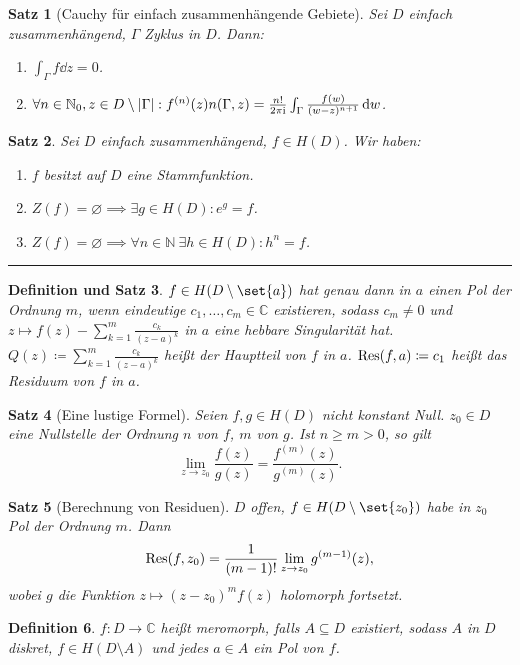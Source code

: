 \documentclass[a4paper]{article}
\newcounter{Sec}
\theoremstyle{marginbreak}
\newtheorem{definition}{Definition}[Sec]
\newtheorem{satz}[definition]{Satz}
\newtheorem{defsatz}[definition]{Definition und Satz}
\newcommand{\sep}{%
	\rule{\textwidth}{0.3pt}%
	\stepcounter{Sec}%
	}
\newcommand{\C}{\mathbb{C}}
\renewcommand{\i}{\mathrm{i}}
\begin{document}
	\begin{satz}[Cauchy für einfach zusammenhängende Gebiete]
		Sei $D$ einfach zusammenhängend, $\Gamma$ Zyklus in $D$. Dann:
		\begin{enumerate}[label=(\alph*)]
			\item $\int_\Gamma f\dd{z}=0$.
			\item $\forall n\in\mathbb{N}_0, z\in D\setminus\abs{\Gamma}:f^{(n)}(z)n(\Gamma, z)=\frac{n!}{2\pi\i}\int_\Gamma\frac{f(w)}{(w-z)^{n+1}}\dd{w}$.
		\end{enumerate}
	\end{satz}
	\begin{satz}
		Sei $D$ einfach zusammenhängend, $f\in H(D)$. Wir haben:
		\begin{enumerate}[label=(\alph*)]
			\item $f$ besitzt auf $D$ eine Stammfunktion.
			\item $Z(f)=\varnothing\implies\exists g\in H(D): e^g=f$.
			\item $Z(f)=\varnothing\implies\forall n\in\mathbb{N}~\exists h\in H(D): h^n=f$.
		\end{enumerate}
	\end{satz}
	\sep
	\begin{defsatz}
		$f\in H(D\setminus\set{a})$ hat genau dann in $a$ einen Pol der Ordnung $m$, wenn eindeutige $c_1,\ldots,c_m\in\C$
		existieren, sodass $c_m\neq 0$ und $z\mapsto f(z)-\sum_{k=1}^m\frac{c_k}{(z-a)^k}$ in $a$ eine hebbare Singularität hat.
		$Q(z)\coloneqq\sum_{k=1}^m\frac{c_k}{(z-a)^k}$ heißt der Hauptteil von $f$ in $a$. $\Res(f, a)\coloneqq c_1$ heißt das
		Residuum von $f$ in $a$.
	\end{defsatz}
	\begin{satz}[Eine lustige Formel]
		Seien $f, g\in H(D)$ nicht konstant Null. $z_0\in D$ eine Nullstelle der Ordnung
		$n$ von $f$, $m$ von $g$. Ist $n\geq m>0$, so gilt
		\[
			\lim_{z\to z_0}\frac{f(z)}{g(z)}=\frac{f^{(m)}(z)}{g^{(m)}(z)}.
		\]
	\end{satz}
	\begin{satz}[Berechnung von Residuen]
		$D$ offen, $f\in H(D\setminus\set{z_0})$ habe in $z_0$ Pol der Ordnung $m$. Dann
		\[
			\Res(f, z_0) = \frac{1}{(m-1)!}\lim_{z\to z_0}g^{(m-1)}(z),
		\]
		wobei $g$ die Funktion $z \mapsto (z-z_0)^mf(z)$ holomorph fortsetzt.
	\end{satz}
	\begin{definition}
		$f\colon D\to\C$ heißt meromorph, falls $A\subseteq D$ existiert, sodass $A$ in
		$D$ diskret, $f\in H(D\setminus A)$ und jedes $a\in A$ ein Pol von $f$.
	\end{definition}
\end{document}
